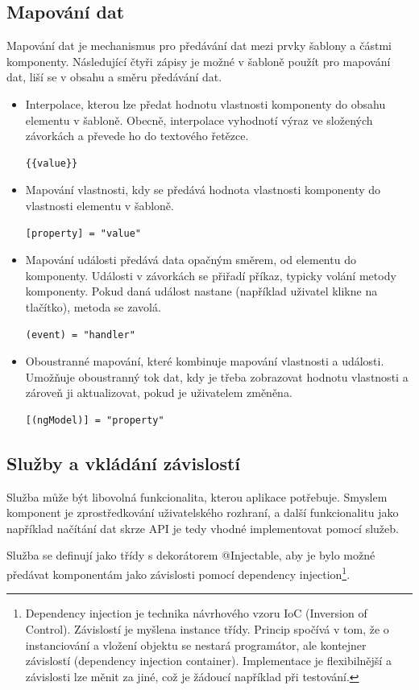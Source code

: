 \documentclass[
  digital, %
  oneside, %
  table,   %
  nolof,     %
  nolot,     %
]{fithesis3}
\begin{document}
\subsection{Mapování dat}
Mapování dat je mechanismus pro předávání dat mezi prvky šablony a částmi komponenty. Následující čtyři zápisy je možné v šabloně použít pro mapování dat, liší se v obsahu a směru předávání dat.
\begin{itemize}
  \item Interpolace, kterou lze předat hodnotu vlastnosti komponenty do obsahu elementu v šabloně. Obecně, interpolace vyhodnotí výraz ve složených závorkách a převede ho do textového řetězce.
\begin{lstlisting}[showstringspaces=false]
{{value}}
\end{lstlisting}
  \item Mapování vlastnosti, kdy se předává hodnota vlastnosti komponenty do vlastnosti elementu v šabloně.
  \begin{lstlisting}[showstringspaces=false]
[property] = "value"
\end{lstlisting}
  \item Mapování události předává data opačným směrem, od elementu do komponenty. Události v závorkách se přiřadí příkaz, typicky volání metody komponenty. Pokud daná událost nastane (například uživatel klikne na tlačítko), metoda se zavolá.
\begin{lstlisting}[showstringspaces=false]
(event) = "handler"
\end{lstlisting}
  \item Oboustranné mapování, které kombinuje mapování vlastnosti a události. Umožňuje oboustranný tok dat, kdy je třeba zobrazovat hodnotu vlastnosti a zároveň ji aktualizovat, pokud je uživatelem změněna.
\begin{lstlisting}[showstringspaces=false]
[(ngModel)] = "property"
\end{lstlisting}
\end{itemize}

\subsection{Služby a vkládání závislostí}
Služba může být libovolná funkcionalita, kterou aplikace potřebuje. Smyslem komponent je zprostředkování uživatelského rozhraní, a další funkcionalitu jako například načítání dat skrze API je tedy vhodné implementovat pomocí služeb.\par
Služba se definují jako třídy s dekorátorem @Injectable, aby je bylo možné předávat komponentám jako závislosti pomocí dependency injection\footnote{Dependency injection je technika návrhového vzoru IoC (Inversion of Control). Závislostí je myšlena instance třídy. Princip spočívá v tom, že o instanciování a vložení objektu se nestará programátor, ale kontejner závislostí (dependency injection container). Implementace je flexibilnější a závislosti lze měnit za jiné, což je žádoucí například při testování.}.
\end{document}

